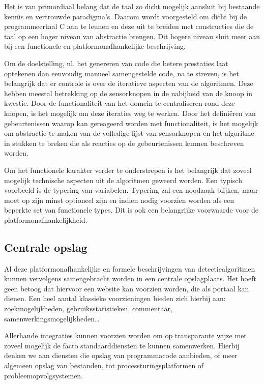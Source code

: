 Het is van primordiaal belang dat de taal zo dicht mogelijk aansluit bij
bestaande kennis en vertrouwde paradigma's. Daarom wordt voorgesteld om dicht
bij de programmeertaal C aan te leunen en deze uit te breiden met constructies
die de taal op een hoger niveau van abstractie brengen. Dit hogere niveau sluit
meer aan bij een functionele en platformonafhankelijke beschrijving.

Om de doelstelling, nl. het genereren van code die betere prestaties laat
optekenen dan eenvoudig manueel samengestelde code, na te streven, is het
belangrijk dat er controle is over de iteratieve aspecten van de algoritmen.
Deze hebben meestal betrekking op de sensorknopen in de nabijheid van de knoop
in kwestie. Door de functionaliteit van het domein te centraliseren rond deze
knopen, is het mogelijk om deze iteraties weg te werken. Door het defini\"eren
van gebeurtenissen waarop kan gereageerd worden met functionaliteit, is het
mogelijk om abstractie te maken van de volledige lijst van sensorknopen en het
algoritme in stukken te breken die als reacties op de gebeurtenissen kunnen
beschreven worden.

Om het functionele karakter verder te onderstrepen is het belangrijk dat zoveel
mogelijk technische aspecten uit de algoritmen geweerd worden. Een typisch
voorbeeld is de typering van variabelen. Typering zal een noodzaak blijken,
maar moet op zijn minst optioneel zijn en indien nodig voorzien worden als een
beperkte set van functionele types. Dit is ook een belangrijke voorwaarde voor
de platformonafhankelijkheid.

\subsection{Centrale opslag}
\label{subsection:arch-repository}

Al deze platformonafhankelijke en formele beschrijvingen van detectiealgoritmen
kunnen vervolgens samengebracht worden in een centrale opslagplaats. Het hoeft
geen betoog dat hiervoor een website kan voorzien worden, die als portaal kan
dienen. Een heel aantal klassieke voorzieningen bieden zich hierbij aan:
zoekmogelijkheden, gebruiksstatistieken, commentaar,
samenwerkingsmogelijkheden\dots

Allerhande integraties kunnen voorzien worden om op transparante wijze met
zoveel mogelijk de facto standaarddiensten te kunnen samenwerken. Hierbij
denken we aan diensten die opslag van programmacode aanbieden, of meer algemeen
opslag van bestanden, tot processturingsplatformen of probleemopvolgsystemen.

